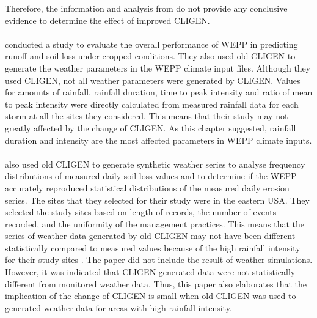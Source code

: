 Therefore, the information and analysis from \citet{baffaut1996-447} do not
provide any conclusive evidence to determine the effect of improved CLIGEN.

\paragraph{\citet{zhang1996-855}} conducted a study to evaluate the overall
performance of
WEPP in predicting runoff and soil loss under cropped conditions. They also used
old CLIGEN to generate the weather parameters in the WEPP climate input files.
Although they used CLIGEN, not all weather parameters were generated by CLIGEN.
Values for amounts of rainfall, rainfall duration, time to peak intensity and
ratio of mean to peak intensity were directly calculated from measured rainfall
data for each storm at all the sites they considered. This means that their
study may not greatly affected by the change of CLIGEN. As this chapter
suggested, rainfall duration and intensity are the most affected parameters in
WEPP climate inputs.

\paragraph{\citet{baffaut1998-756}} also used old CLIGEN to generate synthetic
weather
series to analyse frequency distributions of measured daily soil loss values and
to determine if the WEPP accurately reproduced statistical distributions of the
measured daily erosion series. The sites that they selected for their study
were in the eastern USA. They selected the study sites based on length of
records, the number of events recorded, and the uniformity of the management
practices. This means that the series of weather data generated by old CLIGEN
may not have been different statistically compared to measured values because
of the high rainfall intensity for their study sites \citep{ashley2003-3003}.
The paper did not include the result of weather simulations. However, it
was indicated that CLIGEN-generated data were not statistically different from
monitored weather data. Thus, this paper also elaborates that the implication of
the change of CLIGEN is small when old CLIGEN was used to generated weather
data for areas with high rainfall intensity.

